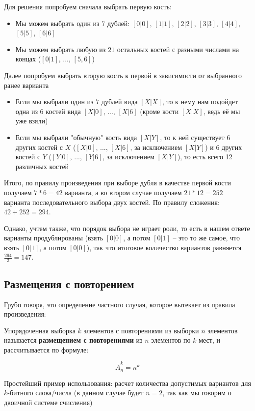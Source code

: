 \documentclass{article}
\begin{document}
Для решения попробуем сначала выбрать первую кость:
\begin{itemize}
    \item Мы можем выбрать один из $7$ дублей: $[0|0]$, $[1|1]$, $[2|2]$, $[3|3]$, $[4|4]$, $[5|5]$, $[6|6]$
    \item Мы можем выбрать любую из $21$ остальных костей с разными числами на концах ($[0|1]$, ..., $[5, 6]$)
\end{itemize}

Далее попробуем выбрать вторую кость к первой в зависимости от выбранного ранее варианта 
\begin{itemize}
	\item Если мы выбрали один из $7$ дублей вида $[X|X]$, 
	то к нему нам подойдет одна из $6$ костей вида $[X|0]$, ..., $[X|6]$ (кроме кости $[X|X]$, ведь её мы уже взяли)
	\item Если мы выбрали "обычную" кость вида $[X|Y]$, то к ней существует $6$ других костей с $X$ 
	($[X|0]$, ..., $[X|6]$, за исключением $[X|Y]$) и $6$ других костей с $Y$
	($[Y|0]$, ..., $[Y|6]$, за исключением $[X|Y]$), то есть всего 12 различных костей
\end{itemize}

Итого, по правилу произведения при выборе дубля в качестве первой кости получаем $7 * 6 = 42$ варианта, 
а во втором случае получаем $21 * 12 = 252$ варианта последовательного выбора двух костей. 
По правилу сложения: $42 + 252 = 294$.

Однако, учтем также, что порядок выбора не играет роли, то есть в нашем ответе варианты продублированы (взять $[0|0]$, а потом $[0|1]$ -- это то же самое, что взять $[0|1]$, а потом $[0|0]$), так что итоговое количество вариантов равняется $\frac{294}{2} = 147$.


\subsection{Размещения с повторением}

Грубо говоря, это определение частного случая, которое вытекает из правила произведения:
\begin{displayquote}
Упорядоченная выборка $k$ элементов с повторениями из выборки $n$ элементов называется \textbf{размещением с повторениями} из $n$ элементов по $k$ мест, и рассчитывается по формуле:

$$
\overline{A}_n^k = n^k
$$
\end{displayquote} 

Простейший пример использования: расчет количества допустимых вариантов для $k$-битного слова/числа (в данном случае будет $n = 2$, так как мы говорим о двоичной системе счисления)
\end{document}
